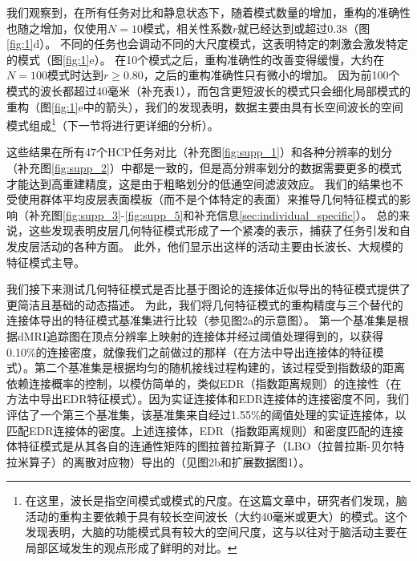 \documentclass[lang=cn,a4paper,newtx]{elegantpaper}
\begin{document}
我们观察到，在所有任务对比和静息状态下，随着模式数量的增加，重构的准确性也随之增加，仅使用$ N=10 $模式，相关性系数$ r $就已经达到或超过0.38（图\ref{fig:1}d）。
不同的任务也会调动不同的大尺度模式，这表明特定的刺激会激发特定的模式（图\ref{fig:1}e）。
在10个模式之后，重构准确性的改善变得缓慢，大约在$ N=100 $模式时达到$ r \geq 0.80 $，之后的重构准确性只有微小的增加。
因为前100个模式的波长都超过40毫米（补充表1），而包含更短波长的模式只会细化局部模式的重构（图\ref{fig:1}e中的箭头），我们的发现表明，数据主要由具有长空间波长的空间模式组成\footnote{在这里，波长是指空间模式或模式的尺度。在这篇文章中，研究者们发现，脑活动的重构主要依赖于具有较长空间波长（大约40毫米或更大）的模式。这个发现表明，大脑的功能模式具有较大的空间尺度，这与以往对于脑活动主要在局部区域发生的观点形成了鲜明的对比。}（下一节将进行更详细的分析）。


这些结果在所有47个HCP任务对比（补充图\ref{fig:supp_1}）和各种分辨率的划分（补充图\ref{fig:supp_2}）中都是一致的，但是高分辨率划分的数据需要更多的模式才能达到高重建精度，这是由于粗略划分的低通空间滤波效应。
我们的结果也不受使用群体平均皮层表面模板（而不是个体特定的表面）来推导几何特征模式的影响（补充图\ref{fig:supp_3}-\ref{fig:supp_5}和补充信息\ref{sec:individual_specific}）。
总的来说，这些发现表明皮层几何特征模式形成了一个紧凑的表示，捕获了任务引发和自发皮层活动的各种方面。
此外，他们显示出这样的活动主要由长波长、大规模的特征模式主导。


我们接下来测试几何特征模式是否比基于图论的连接体近似导出的特征模式提供了更简洁且基础的动态描述。
为此，我们将几何特征模式的重构精度与三个替代的连接体导出的特征模式基准集进行比较（参见图2a的示意图）。
第一个基准集是根据dMRI追踪图在顶点分辨率上映射的连接体并经过阈值处理得到的，以获得0.10\%的连接密度，就像我们之前做过的那样（在方法中导出连接体的特征模式）。第二个基准集是根据均匀的随机接线过程构建的，该过程受到指数级的距离依赖连接概率的控制，以模仿简单的，类似EDR（指数距离规则）的连接性（在方法中导出EDR特征模式）。因为实证连接体和EDR连接体的连接密度不同，我们评估了一个第三个基准集，该基准集来自经过1.55\%的阈值处理的实证连接体，以匹配EDR连接体的密度。上述连接体，EDR（指数距离规则）和密度匹配的连接体特征模式是从其各自的连通性矩阵的图拉普拉斯算子（LBO（拉普拉斯-贝尔特拉米算子）的离散对应物）导出的（见图2b和扩展数据图1）。
\end{document}
